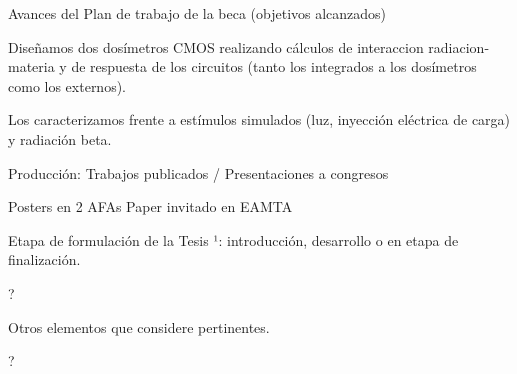 \documentclass{article}
\begin{document}
Avances del Plan de trabajo de la beca (objetivos alcanzados)

Diseñamos dos dosímetros CMOS realizando cálculos de interaccion radiacion-materia y de respuesta de los circuitos (tanto los integrados a los dosímetros como los externos).

Los caracterizamos frente a estímulos simulados (luz, inyección eléctrica de carga) y radiación beta.

Producción: Trabajos publicados  / Presentaciones a congresos

Posters en 2 AFAs
Paper invitado en EAMTA

Etapa de formulación de la Tesis ¹: introducción, desarrollo o en etapa de finalización.

?

Otros elementos que considere pertinentes.

?
\end{document}
